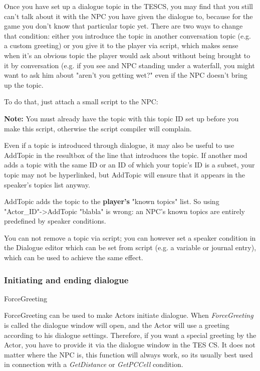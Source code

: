 Once you have set up a dialogue topic in the TESCS, you may find that
you still can't talk about it with the NPC you have given the dialogue
to, because for the game you don't know that particular topic yet. There
are two ways to change that condition: either you introduce the topic in
another conversation topic (e.g. a custom greeting) or you give it to
the player via script, which makes sense when it's an obvious topic the
player would ask about without being brought to it by conversation (e.g.
if you see and NPC standing under a waterfall, you might want to ask him
about "aren't you getting wet?" even if the NPC doesn't bring up the
topic.

To do that, just attach a small script to the NPC:



\textbf{Note:} You must already have the topic with this topic ID set up
before you make this script, otherwise the script compiler will
complain.

Even if a topic is introduced through dialogue, it may also be useful to
use AddTopic in the resultbox of the line that introduces the topic. If
another mod adds a topic with the same ID or an ID of which your topic's
ID is a subset, your topic may not be hyperlinked, but AddTopic will
ensure that it appears in the speaker's topics list anyway.

AddTopic adds the topic to the \textbf{player's} "known topics" list. So
using\\
"Actor\_ID"-\textgreater AddTopic "blabla" is wrong: an NPC's known
topics are entirely predefined by speaker conditions.

You can not remove a topic via script; you can however set a speaker
condition in the Dialogue editor which can be set from script (e.g. a
variable or journal entry), which can be used to achieve the same
effect.

\hypertarget{initiating-and-ending-dialogue}{%
\subsubsection{Initiating and ending
dialogue}\label{initiating-and-ending-dialogue}}

ForceGreeting

ForceGreeting can be used to make Actors initiate dialogue. When
\emph{ForceGreeting} is called the dialogue window will open, and the
Actor will use a greeting according to his dialogue settings. Therefore,
if you want a special greeting by the Actor, you have to provide it via
the dialogue window in the TES CS. It does not matter where the NPC is,
this function will always work, so its usually best used in connection
with a \emph{GetDistance} or \emph{GetPCCell} condition.

